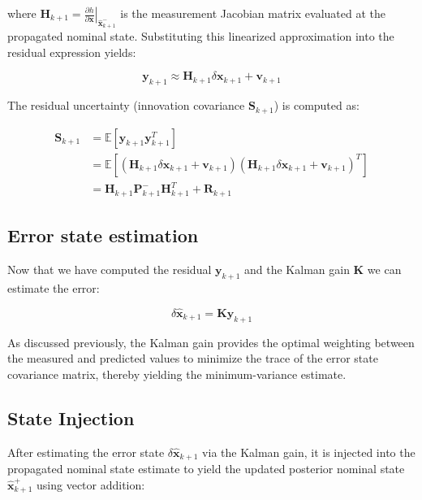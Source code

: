 \documentclass{article}
\begin{document}
	where $\mathbf{H}_{k+1} = \left. \frac{\partial h}{\partial \mathbf{x}} \right|_{\hat{\mathbf{x}}_{k+1}^-}$ is the measurement Jacobian matrix evaluated at the propagated nominal state. Substituting this linearized approximation into the residual expression yields:
	
	\begin{equation}
		\mathbf{y}_{k+1} \approx \mathbf{H}_{k+1} \delta\mathbf{x}_{k+1} + \mathbf{v}_{k+1}
	\end{equation}
	
	The residual uncertainty (innovation covariance $\mathbf{S}_{k+1}$) is computed as:
	
	\begin{align}
		\mathbf{S}_{k+1} &= \mathbb{E}\left[ \mathbf{y}_{k+1} \mathbf{y}_{k+1}^T \right] \nonumber \\
		&= \mathbb{E}\left[ (\mathbf{H}_{k+1} \delta\mathbf{x}_{k+1} + \mathbf{v}_{k+1})(\mathbf{H}_{k+1} \delta\mathbf{x}_{k+1} + \mathbf{v}_{k+1})^T \right] \nonumber \\
		&= \mathbf{H}_{k+1} \mathbf{P}_{k+1}^- \mathbf{H}_{k+1}^T + \mathbf{R}_{k+1}
	\end{align}
	

	\subsection{Error state estimation}
	
	Now that we have computed the residual $\mathbf{y}_{k+1}$ and the Kalman gain $\mathbf{K}$ we can estimate the error:
	
	\begin{equation}
		\delta\hat{\mathbf{x}}_{k+1} = \mathbf{K} \mathbf{y}_{k+1}
	\end{equation}
	
	As discussed previously, the Kalman gain provides the optimal weighting between the measured and predicted values to minimize the trace of the error state covariance matrix, thereby yielding the minimum-variance estimate.
	
	
	\subsection{State Injection}
	
	After estimating the error state $\delta\hat{\mathbf{x}}_{k+1}$ via the Kalman gain, it is injected into the propagated nominal state estimate to yield the updated posterior nominal state $\hat{\mathbf{x}}_{k+1}^+$ using vector addition:
	
\end{document}
